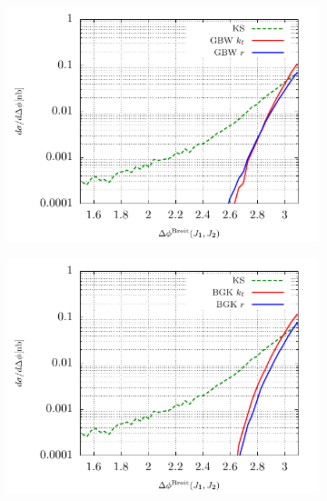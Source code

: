 \documentclass[a4,12pt]{article}
\begin{document}
\begin{figure}[p]
	\begin{subfigure}{0.48\textwidth}
		\includegraphics[width=\textwidth]{gnuplot/plotGBW1Jets} 
	\end{subfigure}
	\begin{subfigure}{0.48\textwidth}
		\includegraphics[width=\textwidth]{gnuplot/plotBGK1Jets} 
	\end{subfigure}
	\begin{subfigure}{0.48\textwidth}

\end{subfigure}
\end{figure}
\end{document}
